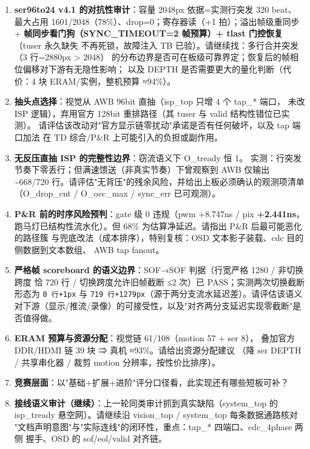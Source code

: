 \documentclass[10pt]{ctexart}
\newcommand{\code}[1]{\texttt{#1}}
\begin{document}
\begin{enumerate}
  \item \textbf{ser96to24 v4.1 的对抗性审计}：容量 2048px 依据=实测行突发 320 beat、
        最大占用 1601/2048（78\%）、drop=0；寄存器读（+1 拍）；溢出帧级重同步 +
        \textbf{帧同步看门狗（SYNC\_TIMEOUT=2 帧预算）+ tlast 门控恢复}（tuser 永久缺失
        不再死锁，故障注入 TB 已验）。请继续找：多行合并突发（3 行=2880px > 2048）
        的分布边界是否可在板级可靠界定；恢复后的帧相位偏移对下游有无隐性影响；
        以及 DEPTH 是否需要更大的量化判断（代价：4 块 ERAM/实例，整机预算 ≈94\%）。
  \item \textbf{抽头点选择}：视觉从 AWB 96bit 直抽（isp\_top 只增 4 个 tap\_* 端口，
        未改 ISP 逻辑），弃用官方 128bit 重排路径（其 tuser 与 valid 结构性错位已实测）。
        请评估该改动对"官方显示链零扰动"承诺是否有任何破坏，以及 tap 端口加法
        在 TD 综合/P\&R 上可能引入的负担或副作用。
  \item \textbf{无反压直抽 ISP 的完整性边界}：窃流语义下 O\_tready 恒 1。
        实测：行突发节奏下零丢行；但满速馈送（非真实节奏）下曾观察到 AWB 仅输出
        \~{}668/720 行。请评估"无背压"的残余风险，并给出上板必须确认的观测项清单
        （O\_drop\_cnt / O\_occ\_max / sync\_err 已可观测）。
  \item \textbf{P\&R 前的时序风险预判}：gate 级 0 违规（pwm +8.747ns / pix \textbf{+2.441ns}，
        跑马灯已结构性流水化）。但 68\% 为估算净延迟。请指出 P\&R 后最可能恶化的路径簇
        与兜底改法（成本排序），特别复核：OSD 文本影子装载、cdc 目的侧数据到文本数组、
        AWB tap fanout。
  \item \textbf{严格帧 scoreboard 的语义边界}：SOF→SOF 判据（行宽严格 1280 / 非切换跨度
        恰 720 行 / 切换跨度允许旧帧截断 ≤2 次）已 PASS；实测两次切换截断形态为
        \code{0 行+1px} 与 \code{719 行+1279px}（源于两分支流水延迟差）。请评估该语义
        对下游（显示/推流/录像）的可接受性，以及"对齐两分支延迟实现零截断"是否值得做。
  \item \textbf{ERAM 预算与资源分配}：视觉链 61/108（motion 57 + ser 8），
        叠加官方 DDR/HDMI 链 39 块 ⇒ 真机 ≈93\%。请给出资源分配建议
        （降 ser DEPTH / 共享串化器 / 裁剪 motion 分辨率，按性价比排序）。
  \item \textbf{竞赛层面}：以"基础+扩展+进阶"评分口径看，此实现还有哪些短板可补？
  \item \textbf{接线语义审计（继续）}：上一轮同类审计抓到真实缺陷（system\_top 的
        isp\_tready 悬空网）。请继续沿 vision\_top / system\_top 每条数据通路核对
        "文档声明意图"与"实际连线"的闭环性，重点：tap\_* 四端口、cdc\_4phase 两侧
        握手、OSD 的 sof/eol/valid 对齐链。
\end{enumerate}
\end{document}
